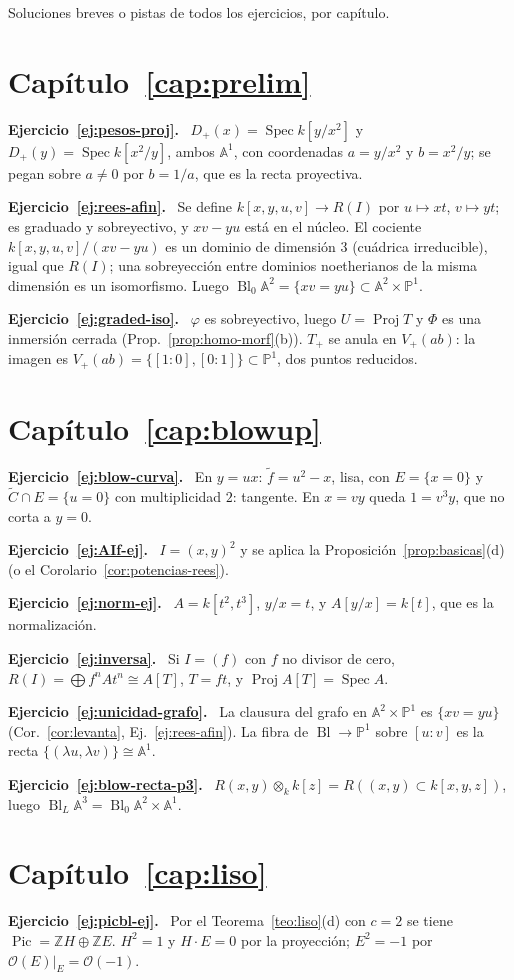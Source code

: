 \documentclass[11pt,a4paper,oneside]{book}
\newcommand{\Spec}{\operatorname{Spec}}
\newcommand{\Proj}{\operatorname{Proj}}
\newcommand{\Bl}{\operatorname{Bl}}
\newcommand{\Pic}{\operatorname{Pic}}
\newcommand{\A}{\mathbb{A}}
\newcommand{\PP}{\mathbb{P}}
\newcommand{\ZZ}{\mathbb{Z}}
\newcommand{\cO}{\mathcal{O}}
\theoremstyle{plain}
\theoremstyle{definition}
\theoremstyle{remark}
\newcounter{ejer}[chapter]
\newcommand{\sol}[1]{\par\medskip\noindent\textbf{Ejercicio~\ref{#1}.}\ }
\begin{document}
Soluciones breves o pistas de todos los ejercicios, por capítulo.

\section*{Capítulo~\ref{cap:prelim}}
\sol{ej:pesos-proj} $D_+(x)=\Spec k[y/x^2]$ y $D_+(y)=\Spec k[x^2/y]$, ambos $\A^1$, con coordenadas $a=y/x^2$ y $b=x^2/y$; se pegan sobre $a\ne0$ por $b=1/a$, que es la recta proyectiva.

\sol{ej:rees-afin} Se define $k[x,y,u,v]\to R(I)$ por $u\mapsto xt$, $v\mapsto yt$; es graduado y sobreyectivo, y $xv-yu$ está en el núcleo. El cociente $k[x,y,u,v]/(xv-yu)$ es un dominio de dimensión $3$ (cuádrica irreducible), igual que $R(I)$; una sobreyección entre dominios noetherianos de la misma dimensión es un isomorfismo. Luego $\Bl_0\A^2=\{xv=yu\}\subset\A^2\times\PP^1$.

\sol{ej:graded-iso} $\varphi$ es sobreyectivo, luego $U=\Proj T$ y $\Phi$ es una inmersión cerrada (Prop.~\ref{prop:homo-morf}(b)). $T_+$ se anula en $V_+(ab)$: la imagen es $V_+(ab)=\{[1:0],[0:1]\}\subset\PP^1$, dos puntos reducidos.

\section*{Capítulo~\ref{cap:blowup}}
\sol{ej:blow-curva} En $y=ux$: $\tilde f=u^2-x$, lisa, con $E=\{x=0\}$ y $\tilde C\cap E=\{u=0\}$ con multiplicidad $2$: tangente. En $x=vy$ queda $1=v^3y$, que no corta a $y=0$.

\sol{ej:AIf-ej} $I=(x,y)^2$ y se aplica la Proposición~\ref{prop:basicas}(d) (o el Corolario~\ref{cor:potencias-rees}).

\sol{ej:norm-ej} $A=k[t^2,t^3]$, $y/x=t$, y $A[y/x]=k[t]$, que es la normalización.

\sol{ej:inversa} Si $I=(f)$ con $f$ no divisor de cero, $R(I)=\bigoplus f^nAt^n\cong A[T]$, $T=ft$, y $\Proj A[T]=\Spec A$.

\sol{ej:unicidad-grafo} La clausura del grafo en $\A^2\times\PP^1$ es $\{xv=yu\}$ (Cor.~\ref{cor:levanta}, Ej.~\ref{ej:rees-afin}). La fibra de $\Bl\to\PP^1$ sobre $[u:v]$ es la recta $\{(\lambda u,\lambda v)\}\cong\A^1$.

\sol{ej:blow-recta-p3} $R(x,y)\otimes_kk[z]=R((x,y)\subset k[x,y,z])$, luego $\Bl_L\A^3=\Bl_0\A^2\times\A^1$.

\section*{Capítulo~\ref{cap:liso}}
\sol{ej:picbl-ej} Por el Teorema~\ref{teo:liso}(d) con $c=2$ se tiene $\Pic=\ZZ H\oplus\ZZ E$. $H^2=1$ y $H\cdot E=0$ por la proyección; $E^2=-1$ por $\cO(E)|_E=\cO(-1)$.
\end{document}
